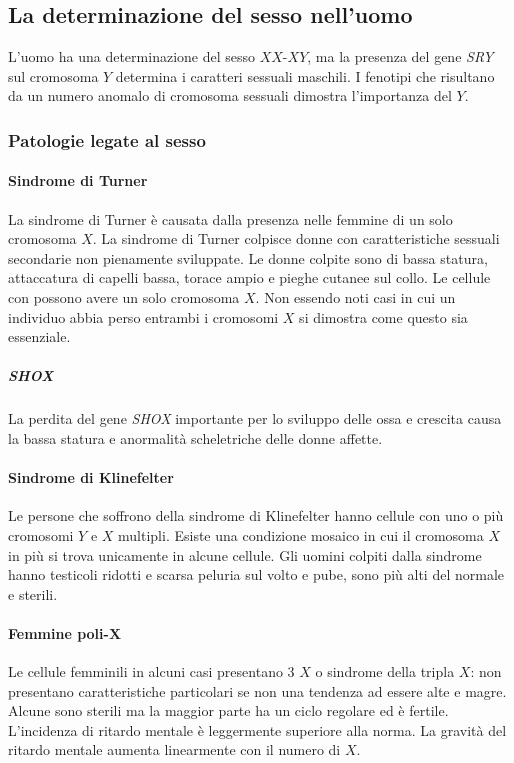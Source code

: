 	\subsection{La determinazione del sesso nell'uomo}
	L'uomo ha una determinazione del sesso $XX$-$XY$, ma la presenza del gene \emph{SRY} sul cromosoma $Y$ determina i caratteri sessuali maschili.
	I fenotipi che risultano da un numero anomalo di cromosoma sessuali dimostra l'importanza del $Y$.
	
		\subsubsection{Patologie legate al sesso}
	
			\paragraph{Sindrome di Turner}
			La sindrome di Turner \`e causata dalla presenza nelle femmine di un solo cromosoma $X$.
			La sindrome di Turner colpisce donne con caratteristiche sessuali secondarie non pienamente sviluppate.
			Le donne colpite sono di bassa statura, attaccatura di capelli bassa, torace ampio e pieghe cutanee sul collo.
			Le cellule con possono avere un solo cromosoma $X$.
			Non essendo noti casi in cui un individuo abbia perso entrambi i cromosomi $X$ si dimostra come questo sia essenziale.

				\subparagraph{\emph{SHOX}}
				La perdita del gene \emph{SHOX} importante per lo sviluppo delle ossa e crescita causa la bassa statura e anormalit\`a scheletriche delle donne affette.

			\paragraph{Sindrome di Klinefelter}
			Le persone che soffrono della sindrome di Klinefelter hanno cellule con uno o pi\`u cromosomi $Y$ e $X$ multipli.
			Esiste una condizione mosaico in cui il cromosoma $X$ in pi\`u si trova unicamente in alcune cellule. 
			Gli uomini colpiti dalla sindrome hanno testicoli ridotti e scarsa peluria sul volto e pube, sono pi\`u alti del normale e sterili.
	
			\paragraph{Femmine poli-$\mathbf{X}$}
			Le cellule femminili in alcuni casi presentano $3$ $X$ o sindrome della tripla $X$: non presentano caratteristiche particolari se non una tendenza ad essere alte e magre.
			Alcune sono sterili ma la maggior parte ha un ciclo regolare ed \`e fertile.
			L'incidenza di ritardo mentale \`e leggermente superiore alla norma.
			La gravit\`a del ritardo mentale aumenta linearmente con il numero di $X$.
	
